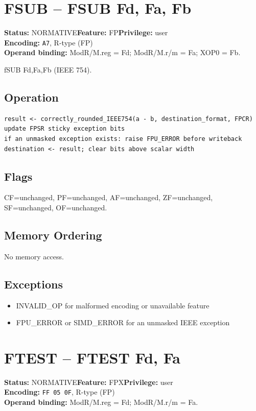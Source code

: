 \documentclass[10pt]{article}
\begin{document}
\section{FSUB -- FSUB Fd, Fa, Fb}
\textbf{Status:} NORMATIVE\quad \textbf{Feature:} FP\quad \textbf{Privilege:} user\\
\textbf{Encoding:} \texttt{A7}, R-type (FP)\\
\textbf{Operand binding:} ModR/M.reg = Fd; ModR/M.r/m = Fa; XOP0 = Fb.

fSUB Fd,Fa,Fb (IEEE 754).

\subsection*{Operation}
\begin{lstlisting}
result <- correctly_rounded_IEEE754(a - b, destination_format, FPCR)
update FPSR sticky exception bits
if an unmasked exception exists: raise FPU_ERROR before writeback
destination <- result; clear bits above scalar width
\end{lstlisting}
\subsection*{Flags}
CF=unchanged, PF=unchanged, AF=unchanged, ZF=unchanged, SF=unchanged, OF=unchanged.
\subsection*{Memory Ordering}
No memory access.
\subsection*{Exceptions}
\begin{itemize}
\item INVALID\_OP for malformed encoding or unavailable feature
\item FPU\_ERROR or SIMD\_ERROR for an unmasked IEEE exception
\end{itemize}
\clearpage

\section{FTEST -- FTEST Fd, Fa}
\textbf{Status:} NORMATIVE\quad \textbf{Feature:} FPX\quad \textbf{Privilege:} user\\
\textbf{Encoding:} \texttt{FF 05 0F}, R-type (FP)\\
\textbf{Operand binding:} ModR/M.reg = Fd; ModR/M.r/m = Fa.
\end{document}
